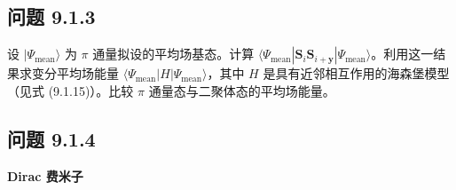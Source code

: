 
\subsection*{问题 9.1.3}

设 $|\Psi_{\text{mean}}\rangle$ 为 $\pi$ 通量拟设的平均场基态。计算 $\langle\Psi_{\text{mean}}|\pmb{S}_i\pmb{S}_{i+\pmb{y}}|\Psi_{\text{mean}}\rangle$。利用这一结果求变分平均场能量 $\langle\Psi_{\text{mean}}|H|\Psi_{\text{mean}}\rangle$，其中 $H$ 是具有近邻相互作用的海森堡模型（见式 (9.1.15)）。比较 $\pi$ 通量态与二聚体态的平均场能量。

\subsection*{问题 9.1.4}

\textbf{Dirac 费米子}

